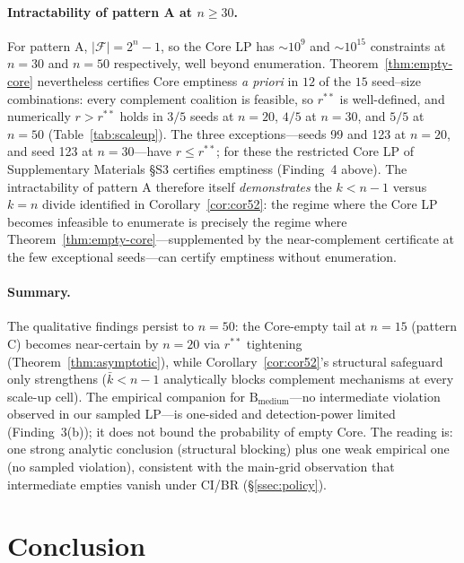 \documentclass[11pt]{article}
\theoremstyle{plain}
\theoremstyle{definition}
\theoremstyle{remark}
\newcommand{\F}{\mathcal{F}}
\begin{document}
\paragraph{Intractability of pattern A at $n\ge 30$.} For pattern A, $|\F| = 2^n-1$, so the Core LP has $\sim\!10^9$ and $\sim\!10^{15}$ constraints at $n=30$ and $n=50$ respectively, well beyond enumeration. Theorem~\ref{thm:empty-core} nevertheless certifies Core emptiness \emph{a priori} in $12$ of the $15$ seed--size combinations: every complement coalition is feasible, so $r^{\ast\ast}$ is well-defined, and numerically $r>r^{\ast\ast}$ holds in $3/5$ seeds at $n=20$, $4/5$ at $n=30$, and $5/5$ at $n=50$ (Table~\ref{tab:scaleup}). The three exceptions---seeds 99 and 123 at $n=20$, and seed 123 at $n=30$---have $r\le r^{\ast\ast}$; for these the restricted Core LP of Supplementary Materials \S S3 certifies emptiness (Finding~4 above). The intractability of pattern A therefore itself \emph{demonstrates} the $k<n-1$ versus $k=n$ divide identified in Corollary~\ref{cor:cor52}: the regime where the Core LP becomes infeasible to enumerate is precisely the regime where Theorem~\ref{thm:empty-core}---supplemented by the near-complement certificate at the few exceptional seeds---can certify emptiness without enumeration.

\paragraph{Summary.} The qualitative findings persist to $n=50$: the Core-empty tail at $n=15$ (pattern C) becomes near-certain by $n=20$ via $r^{\ast\ast}$ tightening (Theorem~\ref{thm:asymptotic}), while Corollary~\ref{cor:cor52}'s structural safeguard only strengthens ($\bar k<n-1$ analytically blocks complement mechanisms at every scale-up cell). The empirical companion for $\text{B}_{\text{medium}}$---no intermediate violation observed in our sampled LP---is one-sided and detection-power limited (Finding~3(b)); it does not bound the probability of empty Core. The reading is: one strong analytic conclusion (structural blocking) plus one weak empirical one (no sampled violation), consistent with the main-grid observation that intermediate empties vanish under CI/BR (\S\ref{ssec:policy}).

\section{Conclusion}
\label{sec:conclusion}
\end{document}
